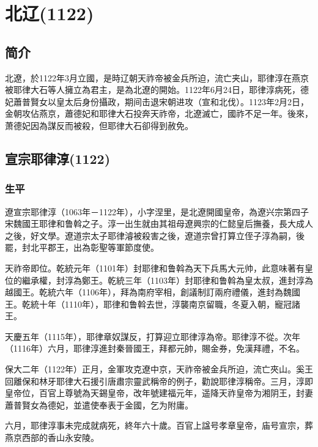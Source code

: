 
\section{北辽\tiny(1122)}

\subsection{简介}

北遼，於1122年3月立國，是時辽朝天祚帝被金兵所迫，流亡夹山，耶律淳在燕京被耶律大石等人擁立為君主，是為北遼的開始。1122年6月24日，耶律淳病死，德妃蕭普賢女以皇太后身份攝政，期间击退宋朝进攻（宣和北伐）。1123年2月2日，金朝攻佔燕京，蕭德妃和耶律大石投奔天祚帝，北遼滅亡，國祚不足一年。後來，萧德妃因為謀反而被殺，但耶律大石卻得到赦免。

\subsection{宣宗耶律淳\tiny(1122)}

\subsubsection{生平}

遼宣宗耶律淳（1063年－1122年），小字涅里，是北遼開國皇帝，為遼兴宗第四子宋魏國王耶律和鲁斡之子。淳一出生就由其祖母遼興宗的仁懿皇后撫養，長大成人之後，好文學。遼道宗太子耶律濬被殺害之後，遼道宗曾打算立侄子淳為嗣，後罷，封北平郡王，出為彰聖等軍節度使。

天祚帝即位。乾統元年（1101年）封耶律和鲁斡為天下兵馬大元帅，此意味著有皇位的繼承權，封淳為鄭王。乾統三年（1103年）封耶律和鲁斡為皇太叔，進封淳為越國王。乾統六年（1106年），拜為南府宰相，創議制訂兩府禮儀，進封為魏國王。乾統十年（1110年），耶律和鲁斡去世，淳襲南京留職，冬夏入朝，寵冠諸王。

天慶五年（1115年），耶律章奴謀反，打算迎立耶律淳為帝。耶律淳不從。次年（1116年）六月，耶律淳進封秦晉國王，拜都元帥，賜金券，免漢拜禮，不名。

保大二年（1122年）正月，金軍攻克遼中京，天祚帝被金兵所迫，流亡夾山。奚王回離保和林牙耶律大石援引唐肅宗靈武稱帝的例子，勸說耶律淳稱帝。三月，淳即皇帝位，百官上尊號為天錫皇帝，改年號建福元年，遥降天祚皇帝为湘阴王，封妻蕭普賢女為德妃，並遣使奉表于金國，乞为附庸。

六月，耶律淳事未完成就病死，終年六十歲。百官上諡号孝章皇帝，庙号宣宗，葬燕京西部的香山永安陵。

